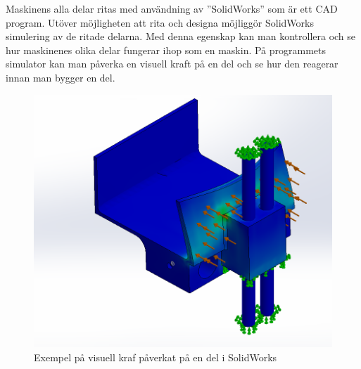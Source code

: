 Maskinens alla delar ritas med användning av ”SolidWorks” som är ett CAD program. Utöver möjligheten att rita och designa möjliggör SolidWorks simulering av de ritade delarna. Med denna egenskap kan man kontrollera och se hur maskinenes olika delar fungerar ihop som en maskin. På programmets simulator kan man påverka en visuell kraft på en del och se hur den reagerar innan man bygger en del.
\begin{figure}[ht]
	\begin{center}
		\includegraphics[scale=0.8]{images/hissEdited.png}
		\caption{Exempel på visuell kraf påverkat på en del i SolidWorks}
		\label{simulering}	
	\end{center}
\end{figure}